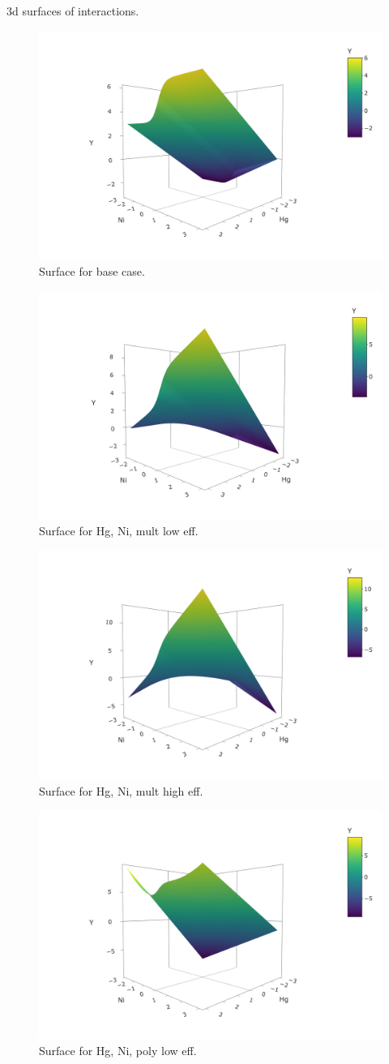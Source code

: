 \documentclass[12pt, twoside]{amherstthesis}
\begin{document}
3d surfaces of interactions.
\begin{figure}

{\centering \includegraphics[width=0.5\linewidth]{figures/surfaces/p00} 

}

\caption{Surface for base case.}\label{fig:basesurf}
\end{figure}
\begin{figure}

{\centering \includegraphics[width=0.5\linewidth]{figures/surfaces/am1} 

}

\caption{Surface for Hg, Ni, mult low eff.}\label{fig:am1}
\end{figure}
\begin{figure}

{\centering \includegraphics[width=0.5\linewidth]{figures/surfaces/am2} 

}

\caption{Surface for Hg, Ni, mult high eff.}\label{fig:am2}
\end{figure}
\begin{figure}

{\centering \includegraphics[width=0.5\linewidth]{figures/surfaces/ap1} 

}

\caption{Surface for Hg, Ni, poly low eff.}\label{fig:ap1}
\end{figure}
\end{document}
